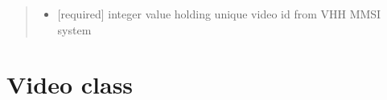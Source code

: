 \documentclass[letterpaper,10pt,english,openany,oneside]{sphinxmanual}
\begin{document}
\begin{fulllineitems}
\begin{fulllineitems}
\begin{quote}
\begin{description}
\begin{itemize}
\item {} 
 \textendash{} {[}required{]} integer value holding unique video id from VHH MMSI system

\end{itemize}

\end{description}\end{quote}

\end{fulllineitems}


\end{fulllineitems}



\section{Video class}
\label{\detokenize{Video:video-class}}\label{\detokenize{Video::doc}}
\end{document}
